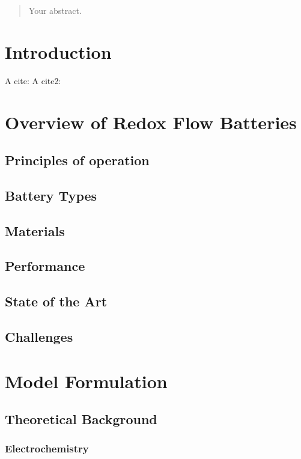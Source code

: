 \begin{abstract}
Your abstract.
\end{abstract}

\thispagestyle{empty}
\tableofcontents
\newpage


\setcounter{page}{1}


\section{Introduction}
A cite: \cite{my_cool_citekey}
A cite2: \cite{my_cool_citekey2}
\section{Overview of Redox Flow Batteries}

\subsection{Principles of operation}
\subsection{Battery Types}
\subsection{Materials}
\subsection{Performance}
\subsection{State of the Art}
\subsection{Challenges}

\section{Model Formulation}
\subsection{Theoretical Background}
\subsubsection{Electrochemistry}
